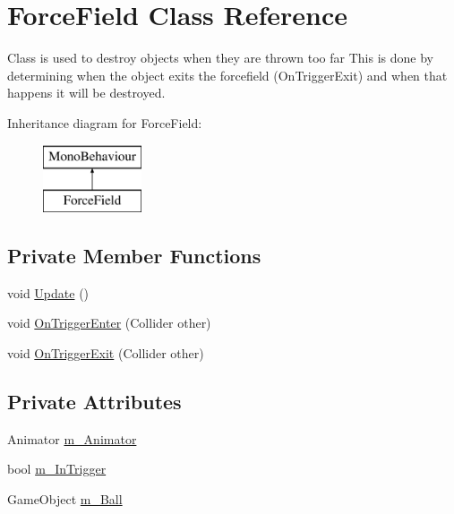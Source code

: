 \hypertarget{class_force_field}{}\section{Force\+Field Class Reference}
\label{class_force_field}


Class is used to destroy objects when they are thrown too far This is done by determining when the object exits the forcefield (On\+Trigger\+Exit) and when that happens it will be destroyed.  


Inheritance diagram for Force\+Field\+:\begin{figure}[H]
\begin{center}
\leavevmode
\includegraphics[height=2.000000cm]{class_force_field}
\end{center}
\end{figure}
\subsection*{Private Member Functions}
\begin{DoxyCompactItemize}
\item 
void \mbox{\hyperlink{class_force_field_a3a46258294cc671a8d35ebcc968602bb}{Update}} ()
\item 
void \mbox{\hyperlink{class_force_field_aa8354be76d0c19d705db2cc025e8095e}{On\+Trigger\+Enter}} (Collider other)
\item 
void \mbox{\hyperlink{class_force_field_a8ffe5c4cd5f6a4f2626f496760631c74}{On\+Trigger\+Exit}} (Collider other)
\end{DoxyCompactItemize}
\subsection*{Private Attributes}
\begin{DoxyCompactItemize}
\item 
Animator \mbox{\hyperlink{class_force_field_a48087ec1814d9b3b0c64d568c50704a8}{m\+\_\+\+Animator}}
\item 
bool \mbox{\hyperlink{class_force_field_add42e1b3ae6deec80beca3a10831bf71}{m\+\_\+\+In\+Trigger}}
\item 
Game\+Object \mbox{\hyperlink{class_force_field_a3fe0e589031437d56a08af4f313b9193}{m\+\_\+\+Ball}}
\end{DoxyCompactItemize}


